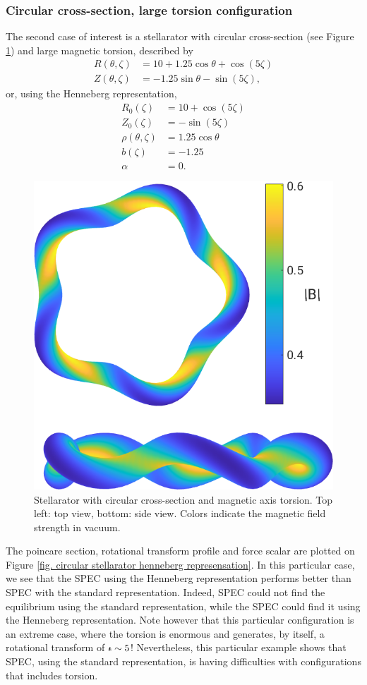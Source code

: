 \documentclass[my_thesis.tex]{subfiles}
\begin{document}
\subsubsection{Circular cross-section, large torsion configuration}
The second case of interest is a stellarator with circular cross-section (see Figure \ref{fig. circular stellarator geometry}) and large magnetic torsion, described by
\begin{align}
	R(\theta,\zeta) &= 10 + 1.25\cos\theta + \cos(5\zeta)\\
	Z(\theta,\zeta) &= -1.25\sin\theta - \sin(5\zeta), 
\end{align}
or, using the Henneberg representation,
\begin{align}
    R_0(\zeta) &= 10 + \cos(5\zeta)\\
	Z_0(\zeta) &= -\sin(5\zeta)\\
	\rho(\theta,\zeta) &= 1.25\cos\theta\\
	b(\zeta) &= -1.25\\
	\alpha &= 0.
\end{align}
\begin{figure}
	\centering
	\includegraphics[width=.8\linewidth]{images/HennebergRepresentation/CircularTorsion_modB_boundary.png}
	\caption{Stellarator with circular cross-section and magnetic axis torsion. Top left: top view, bottom: side view. Colors indicate the magnetic field strength in vacuum.}
	\label{fig. circular stellarator geometry}
\end{figure}

The poincare section, rotational transform profile and force scalar are plotted on Figure \ref{fig. circular stellarator henneberg represensation}. In this particular case, we see that the SPEC using the Henneberg representation performs better than SPEC with the standard representation. Indeed, SPEC could not find the equilibrium using the standard representation, while the SPEC could find it using the Henneberg representation. Note however that this particular configuration is an extreme case, where the torsion is enormous and generates, by itself, a rotational transform of $\text{$\iota\!\!$-}\sim 5$! Nevertheless, this particular example shows that SPEC, using the standard representation, is having difficulties with configurations that includes torsion. 
\end{document}
